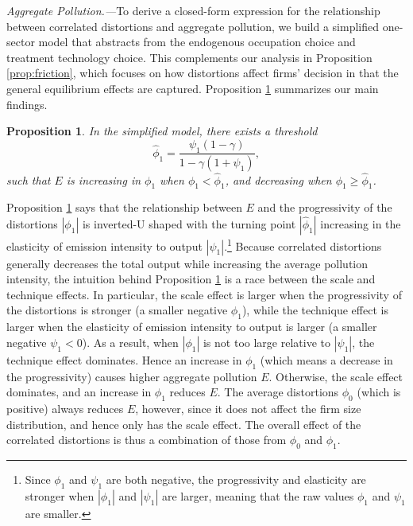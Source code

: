 \documentclass[AEJ]{AEA}
\newtheorem{proposition}{Proposition}
\begin{document}
\textit{Aggregate Pollution.---}To derive a closed-form expression for the relationship between correlated distortions and aggregate pollution, we build a simplified one-sector model that abstracts from the endogenous occupation choice and treatment technology choice. %
This complements our analysis in Proposition \ref{prop:friction}, which focuses on how distortions affect firms' decision in that the general equilibrium effects are captured. Proposition \ref{prop:agge} summarizes our main findings.
\begin{proposition}
\label{prop:agge}
In the simplified model, there exists a threshold
\begin{equation*}
    \hat{\phi}_1 = \frac{\psi_1(1-\gamma)}{1-\gamma(1+\psi_1)},
\end{equation*}
such that $E$ is increasing in $\phi_1$ when $\phi_1 < \hat{\phi}_1$, and decreasing when $\phi_1 \geq \hat{\phi}_1$.
\end{proposition}

Proposition \ref{prop:agge} says that the relationship between $E$ and the progressivity of the distortions $|\phi_1|$ is inverted-U shaped with the turning point $|\hat{\phi}_1|$ increasing in the elasticity of emission intensity to output $|\psi_1|$.\footnote{Since $\phi_1$ and $\psi_1$ are both negative, the progressivity and elasticity are stronger when $|\phi_1|$ and $|\psi_1|$ are larger, meaning that the raw values $\phi_1$ and $\psi_1$ are smaller.} Because correlated distortions generally decreases the total output while increasing the average pollution intensity, the intuition behind Proposition \ref{prop:agge} is a race between the scale and technique effects. In particular, the scale effect is larger when the progressivity of the distortions is stronger (a smaller negative $\phi_1$), while the technique effect is larger when the elasticity of emission intensity to output is larger (a smaller negative $\psi_1<0$). As a result, when $|\phi_1|$ is not too large relative to $|\psi_1|$, the technique effect dominates. Hence an increase in $\phi_1$ (which means a decrease in the progressivity) causes higher aggregate pollution $E$. Otherwise, the scale effect dominates, and an increase in $\phi_1$ reduces $E$. The average distortions $\phi_0$ (which is positive) always reduces $E$, however, since it does not affect the firm size distribution, and hence only has the scale effect. The overall effect of the correlated distortions is thus a combination of those from $\phi_0$ and $\phi_1$.
\end{document}
